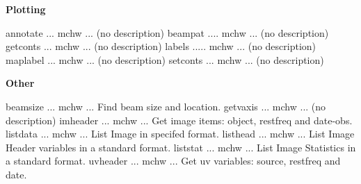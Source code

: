 \par\centerline {\bf Plotting}
{\eightpoint\begintt
annotate ... mchw ... (no description)
beampat .... mchw ... (no description)
getconts ... mchw ... (no description)
labels ..... mchw ... (no description)
maplabel ... mchw ... (no description)
\endtt}
{\eightpoint\begintt
setconts ... mchw ... (no description)
\endtt}
\par\centerline {\bf Other}
{\eightpoint\begintt
beamsize ... mchw ... Find beam size and location.
getvaxis ... mchw ... (no description)
imheader ... mchw ... Get image items: object, restfreq and date-obs.
listdata ... mchw ... List Image in specifed format.
listhead ... mchw ... List Image Header variables in a standard format.
\endtt}
{\eightpoint\begintt
liststat ... mchw ... List Image Statistics in a standard format.
uvheader ... mchw ... Get uv variables: source, restfreq and date.
\endtt}
